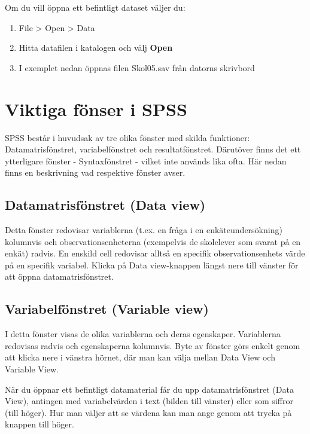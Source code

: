 \documentclass[
]{book}
\providecommand{\tightlist}{%
  \setlength{\itemsep}{0pt}\setlength{\parskip}{0pt}}
\begin{document}
Om du vill öppna ett befintligt dataset väljer du:

\begin{enumerate}
\def\labelenumi{\arabic{enumi}.}
\tightlist
\item
  File \textgreater{} Open \textgreater{} Data
\item
  Hitta datafilen i katalogen och välj \textbf{Open}
\item
  I exemplet nedan öppnas filen Skol05.sav från datorns skrivbord
\end{enumerate}

\hypertarget{viktiga-fuxf6nser-i-spss}{%
\chapter{Viktiga fönser i SPSS}\label{viktiga-fuxf6nser-i-spss}}

SPSS består i huvudsak av tre olika fönster med skilda funktioner: Datamatrisfönstret, variabelfönstret och resultatfönstret. Därutöver finns det ett ytterligare fönster - Syntaxfönstret - vilket inte används lika ofta. Här nedan finns en beskrivning vad respektive fönster avser.

\hypertarget{datamatrisfuxf6nstret-data-view}{%
\section{Datamatrisfönstret (Data view)}\label{datamatrisfuxf6nstret-data-view}}

Detta fönster redovisar variablerna (t.ex. en fråga i en enkäteundersökning) kolumnvis och observationsenheterna (exempelvis de skolelever som svarat på en enkät) radvis. En enskild cell redovisar alltså en specifik observationsenhets värde på en specifik variabel. Klicka på Data view-knappen längst nere till vänster för att öppna datamatrisfönstret.

\hypertarget{variabelfuxf6nstret-variable-view}{%
\section{Variabelfönstret (Variable view)}\label{variabelfuxf6nstret-variable-view}}

I detta fönster visas de olika variablerna och deras egenskaper. Variablerna redovisas radvis och egenskaperna kolumnvis. Byte av fönster görs enkelt genom att klicka nere i vänstra hörnet, där man kan välja mellan Data View och Variable View.

När du öppnar ett befintligt datamaterial får du upp datamatrisfönstret (Data View), antingen med variabelvärden i text (bilden till vänster) eller som siffror (till höger). Hur man väljer att se värdena kan man ange genom att trycka på knappen till höger.
\end{document}
